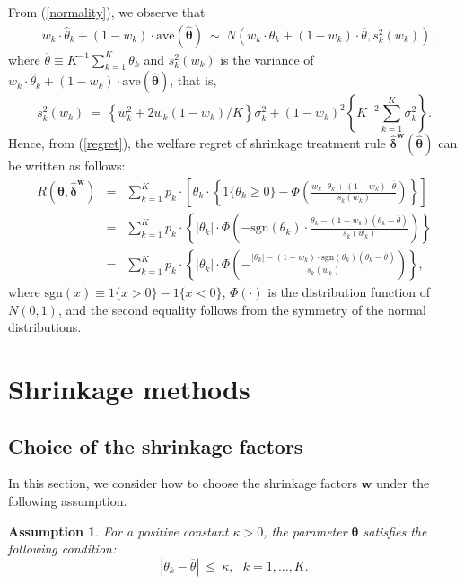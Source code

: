 \documentclass[12pt,a4paper]{article}
\newtheorem{Assumption}{Assumption}
\begin{document}
From (\ref{normality}), we observe that
\begin{eqnarray*}
& w_k \cdot \hat{\theta}_k + (1-w_k) \cdot \mathrm{ave}(\hat{\bm{\theta}}) \ \sim \ N \left( w_k \cdot \theta_k + (1-w_k) \cdot \overline{\theta}, s_k^2(w_k) \right),
\end{eqnarray*}
where $\overline{\theta} \equiv K^{-1}\sum_{k=1}^K \theta_k$ and $s_k^2(w_k)$ is the variance of $w_k \cdot \hat{\theta}_k + (1-w_k) \cdot \mathrm{ave}(\hat{\bm{\theta}})$, that is,
$$
s_k^2(w_k) \ = \ \left\{ w_k^2 + 2w_k(1-w_k)/K \right\} \sigma_k^2 + (1-w_k)^2 \left\{ K^{-2} \sum_{k=1}^K \sigma_k^2 \right\}.
$$
Hence, from (\ref{regret}), the welfare regret of shrinkage treatment rule $\hat{\bm{\delta}}^{\bm{w}}(\hat{\bm{\theta}})$ can be written as follows:
\begin{eqnarray}
R(\bm{\theta},\hat{\bm{\delta}}^{\bm{w}}) &=& \sum_{k=1}^K p_k \cdot \left[ \theta_k \cdot \left\{ 1\{\theta_k \geq 0\} - \Phi \left( \frac{w_k \cdot \theta_k + (1-w_k) \cdot \overline{\theta}}{s_k(w_k)} \right) \right\} \right] \nonumber \\
&=& \sum_{k=1}^K p_k \cdot \left\{ |\theta_k| \cdot  \Phi \left( - \text{sgn}(\theta_k) \cdot \frac{\theta_k - (1-w_k) (\theta_k - \overline{\theta})}{s_k(w_k)} \right) \right\} \nonumber \\
&=& \sum_{k=1}^K p_k \cdot \left\{ |\theta_k| \cdot  \Phi \left( -   \frac{|\theta_k| - (1-w_k) \cdot \text{sgn}(\theta_k) (\theta_k - \overline{\theta})}{s_k(w_k)} \right) \right\}, \label{regret_shrinkage}
\end{eqnarray}
where $\text{sgn}(x) \equiv 1\{x>0\} -1\{x<0\}$, $\Phi(\cdot)$ is the distribution function of $N(0,1)$, and the second equality follows from the symmetry of the normal distributions.


\section{Shrinkage methods}\label{Sec:shrink}

\subsection{Choice of the shrinkage factors}\label{SubSec:choice}
In this section, we consider how to choose the shrinkage factors $\bm{w}$ under the following assumption.

\begin{Assumption}\label{ass:parameter_space}
For a positive constant $\kappa > 0$, the parameter $\bm{\theta}$ satisfies the following condition:
$$
\left| \theta_k - \overline{\theta} \right| \ \leq \ \kappa, \ \ \ k = 1, \ldots, K.
$$
\end{Assumption}
\end{document}
